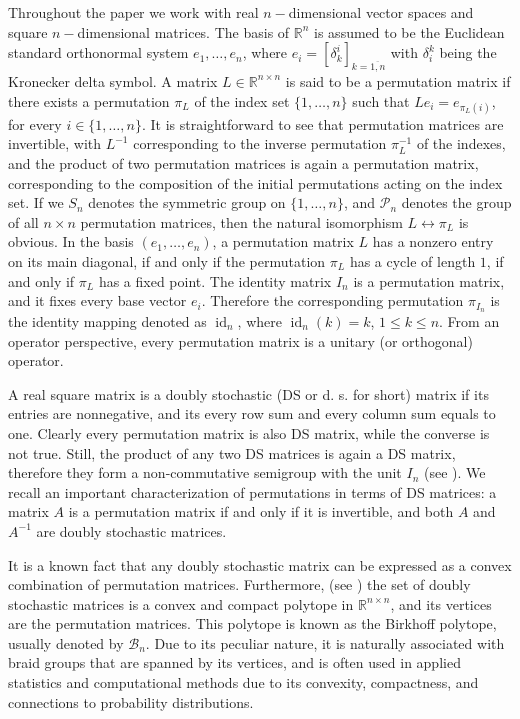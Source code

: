 \documentclass{article}
\theoremstyle{definition}\newtheorem{example}{Example}[section]
\def\B{{\mathcal{B}}}
\def\P{{\mathcal{P}}}
\def\RR{\mathbb{R}}
\begin{document}
	
	Throughout the paper we work with real $n-$dimensional vector spaces and square $n-$dimensional matrices. The basis of $\RR^n$ is assumed to be the Euclidean standard orthonormal system $e_1,\ldots,e_n$, where $e_i=[\delta_k^i]_{k=\overline{1,n}}$ with $\delta_i^k$ being the Kronecker delta symbol. A matrix $L\in\RR^{n\times n}$ is said to be a permutation matrix if there exists a permutation $\pi_L$ of the index set $\{1,\ldots, n\}$ such that $Le_i=e_{\pi_L(i)}$, for every $i\in\{1,\ldots,n\}$. It is straightforward to see that permutation matrices are invertible, with $L^{-1}$ corresponding to the inverse permutation $\pi^{-1}_L$ of the indexes, and the product of two permutation matrices is again a permutation matrix, corresponding to the composition of the initial permutations acting on the index set. If we $S_n$ denotes the symmetric group on $\{1,\ldots,n\}$, and
	$\P_n$ denotes the group of all $n\times n$ permutation matrices, then the natural isomorphism $L\leftrightarrow \pi_L$ is obvious. In the basis $(e_1,\ldots,e_n)$, a permutation matrix $L$ has a nonzero entry on its main diagonal, if and only if the permutation $\pi_L$ has a cycle of length $1$, if and only if $\pi_L$ has a fixed point. The identity matrix $I_n$ is a permutation matrix, and it fixes every base vector $e_i$. Therefore the corresponding permutation $\pi_{I_n}$ is the identity mapping denoted as $\operatorname{id}_n$, where $\operatorname{id}_n(k)=k$, $1\leq k\leq n$. From an operator perspective, every permutation matrix is a unitary (or orthogonal) operator. 
	
	
	A real square matrix is a doubly stochastic (DS or d. s. for short) matrix if its entries are nonnegative, and its every row sum and every column sum equals to one. Clearly every permutation matrix is also DS matrix, while the converse is not true. Still, the product of any two DS matrices is again a DS matrix, therefore they form a non-commutative semigroup with the unit $I_n$ (see \cite{HKF}). We recall an important characterization of permutations in terms of DS matrices: a matrix $A$ is a permutation matrix if and only if it is invertible, and both $A$ and $A^{-1}$ are doubly stochastic matrices.
	
		
	
	It is a known fact that any doubly stochastic matrix can be expressed as a convex combination of permutation matrices. Furthermore, (see \cite{RB}) the set
	of doubly stochastic matrices is a convex and compact polytope  in $\RR^{n\times n}$, and its vertices are the permutation matrices. This polytope is known as the Birkhoff polytope, usually denoted by $\B_n$. Due to its peculiar nature, it is naturally associated with braid groups that are spanned by its vertices, and is often used in applied statistics and computational methods due to its convexity, compactness, and connections to probability distributions. 
	
\end{document}
